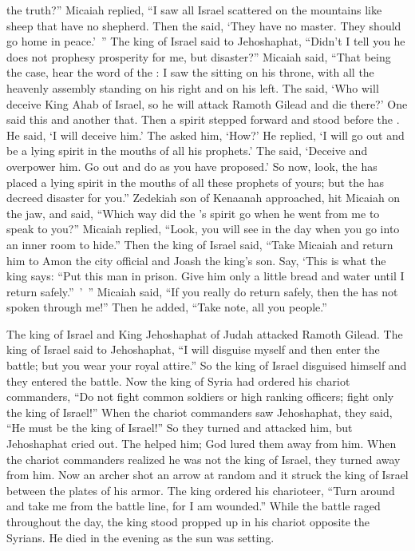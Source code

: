 {the truth?”
Micaiah replied,
“I saw
all
Israel
scattered
on
the mountains
like sheep
that
have no
shepherd.
Then the
{}
said,
‘They have no
master.
They
should go
home
in peace.’ ”
The king
of Israel
said
to
Jehoshaphat,
“Didn’t
I tell
you he does not
prophesy
prosperity
for
me, but
disaster?”
Micaiah said,
“That being
the case, hear
the word
of the {}: I saw
the {}
sitting
on
his throne,
with all
the heavenly
assembly
standing
on
his right
and on his left.
The
{}
said,
‘Who
will deceive
King
Ahab
of Israel,
so
he will attack
Ramoth
Gilead
and die
there?’ One
said
this
and another that.
Then
a spirit
stepped
forward and stood
before
the {}. He said,
‘I
will deceive
him.’ The
{}
asked
him, ‘How?’
He replied,
‘I will go out
and be
a lying
spirit
in the mouths
of all
his prophets.’
The
{} said,
‘Deceive
and overpower him. Go out
and do
as you have proposed.’
So now,
look,
the {}
has placed
a lying
spirit
in the mouths
of all these
prophets
of yours;
but the
{}
has decreed
disaster for you.”
Zedekiah
son
of Kenaanah
approached,
hit
Micaiah
on
the jaw,
and said,
“Which
way
did the
{}’s
spirit
go when
he went from me to speak
to you?”
Micaiah
replied,
“Look,
you will see
in the day
when
you go
into an inner room
to hide.”
Then the king
of Israel
said,
“Take
Micaiah
and return
him to
Amon
the city
official
and Joash
the king’s
son.
Say,
‘This is what
the king
says: “Put
this
man in prison.
Give
him only a little
bread
and water
until
I return
safely.” ’ ”
Micaiah
said,
“If
you really
do return
safely,
then
the {}
has not
spoken
through me!” Then he added, “Take note,
all
you people.”
\par }{\PP {}The king
of Israel
and King
Jehoshaphat
of Judah
attacked
Ramoth
Gilead.
The king
of Israel
said
to
Jehoshaphat,
“I will disguise
myself and then enter
the battle;
but you
wear
your royal attire.”
So the king
of Israel
disguised
himself and they entered
the battle.
Now the king
of Syria
had ordered
his chariot
commanders,
“Do not
fight
common soldiers or
high ranking
officers; fight only
the king
of Israel!”
When
the chariot
commanders
saw
Jehoshaphat,
they
said,
“He must
be the king
of Israel!” So they turned
and attacked
him, but Jehoshaphat
cried
out. The
{}
helped
him; God
lured
them away from him.
When
the chariot
commanders
realized
he was not
the king
of Israel,
they turned
away
from him.
Now an archer
shot
an arrow
at random
and it struck
the king
of Israel
between
the plates
of his armor.
The king ordered
his charioteer,
“Turn
around
and take
me from
the battle line,
for
I am wounded.”
While the battle
raged
throughout the day,
the king
stood
propped up in his chariot
opposite
the Syrians.
He died
in the evening
as
the sun
was setting.

}
